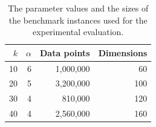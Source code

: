 %
\begin{table}
	\begin{center}%
	\caption{The parameter values and the sizes of the benchmark instances used for the experimental evaluation.}
	\label{tab:benchmark-instances-overview}
	\begin{tabular}{rrrr}
		\toprule
        $k$
		    & $\alpha$
		    & Data points
		    & Dimensions
            \\
		\midrule
        10
    		& 6
    		& 1,000,000
    		& 60
    		\\
        20
    		& 5
    		& 3,200,000
    		& 100
    		\\
        30
    		& 4
    		& 810,000
    		& 120
    		\\
        40
    		& 4
    		& 2,560,000
    		& 160
    		\\
		\bottomrule
	\end{tabular}\\
	\end{center}
\end{table}



